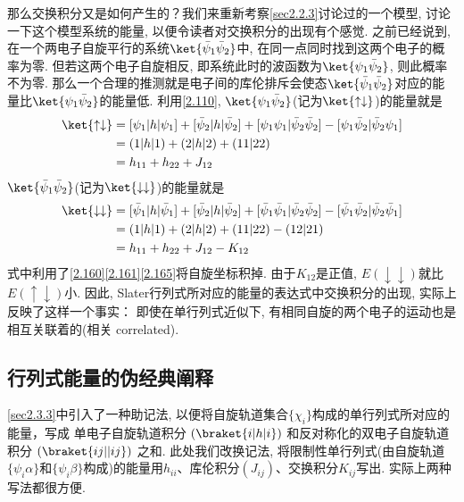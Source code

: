 那么交换积分又是如何产生的？我们来重新考察\autoref{sec2.2.3}讨论过的一个模型, 
讨论一下这个模型系统的能量, 
以便令读者对交换积分的出现有个感觉. 
之前已经说到, 
在一个两电子自旋平行的系统$\ket{\bar{\psi}_1\bar{\psi}_2}$中, 
在同一点同时找到这两个电子的概率为零. 
但若这两个电子自旋相反, 
即系统此时的波函数为$\ket{{\psi}_1\bar{\psi}_2}$, 
则此概率不为零. 
那么一个合理的推测就是电子间的库伦排斥会使态$\ket{\bar{\psi}_1\bar{\psi}_2}$对应的能量比$\ket{\psi_1\bar{\psi}_2}$的能量低. 
利用\autoref{2.110}, 
$\ket{\psi_1\bar{\psi}_2}$(记为$\ket{\uparrow\downarrow}$)的能量就是
\begin{align}
\ket{\uparrow\downarrow} & =[\psi_1|h|\psi_1] + [\bar{\psi}_2|h|\bar{\psi}_2] + [\psi_1\psi_1|\bar{\psi}_2\bar{\psi}_2] - [\psi_1\bar{\psi}_2|\bar{\psi}_2\psi_1]\notag\\
& = (1|h|1) + (2|h|2) + (11|22)\notag\\
& = h_{11} + h_{22} + J_{12}
\end{align}
$\ket{\bar{\psi}_1\bar{\psi}_2}$(记为$\ket{\downarrow\downarrow}$)的能量就是
\begin{align}
\ket{\downarrow\downarrow} & =[\bar{\psi}_1|h|\bar{\psi}_1] + [\bar{\psi}_2|h|\bar{\psi}_2] + [\bar{\psi}_1\bar{\psi}_1|\bar{\psi}_2\bar{\psi}_2] - [\bar{\psi}_1\bar{\psi}_2|\bar{\psi}_2\bar{\psi}_1]\notag\\
& = (1|h|1) + (2|h|2) + (11|22) - (12|21)\notag\\
& = h_{11} + h_{22} + J_{12} - K_{12}
\end{align}
式中利用了\autoref{2.160}\autoref{2.161}\autoref{2.165}将自旋坐标积掉. 
由于$K_{12}$是正值, 
$E(\downarrow\downarrow)$就比$E(\uparrow\downarrow)$小. 
因此, 
Slater行列式所对应的能量的表达式中交换积分的出现, 
实际上反映了这样一个事实： 即使在单行列式近似下, 
有相同自旋的两个电子的运动也是相互关联着的(相关 correlated).

\subsection{行列式能量的伪经典阐释}
\label{sec2.3.7}
\autoref{sec2.3.3}中引入了一种助记法, 
以便将自旋轨道集合$\{\chi_i\}$构成的单行列式所对应的能量，写成
单电子自旋轨道积分 $(\braket{i|h|i})$ 和反对称化的双电子自旋轨道积分 $(\braket{ij||ij})$ 之和. 
此处我们改换记法, 
将限制性单行列式(由自旋轨道$\{ \psi_i\alpha \}$和$\{ \psi_i\beta \}$构成)的能量用$h_{ii}$、库伦积分$(J_{ij})$、交换积分$K_{ij}$写出. 
实际上两种写法都很方便.

